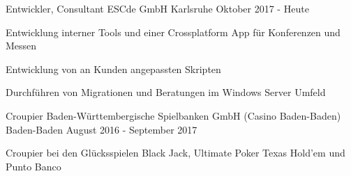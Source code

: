 


\begin{cventries}


\cventry
{Entwickler, Consultant} %
{ESCde GmbH} %
{Karlsruhe} %
{Oktober 2017 - Heute} %
{ %
\begin{cvitems}
\item {Entwicklung interner Tools und einer Crossplatform App für Konferenzen und Messen}
\item {Entwicklung von an Kunden angepassten Skripten}
\item {Durchführen von Migrationen und Beratungen im Windows Server Umfeld}
\end{cvitems}
}

\cventry
{Croupier} %
{Baden-Württembergische Spielbanken GmbH (Casino Baden-Baden)} %
{Baden-Baden} %
{August 2016 - September 2017} %
{ %
\begin{cvitems}
\item {Croupier bei den Glücksspielen Black Jack, Ultimate Poker Texas Hold'em und Punto Banco}
\end{cvitems}
}

\end{cventries}